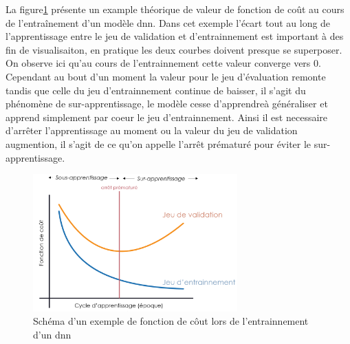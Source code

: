 La figure\ref{fig:loss_func} présente un example théorique de valeur de fonction de coût au cours de l'entraînement d'un modèle \gls{dnn}. Dans cet exemple l'écart tout au long de l'apprentissage entre le jeu de validation et d'entrainnement est important à des fin de visualisaiton, en pratique les deux courbes doivent presque se superposer. On observe ici qu'au cours de l'entrainnement cette valeur converge vers 0. Cependant au bout d'un moment la valeur pour le jeu d'évaluation remonte tandis que celle du jeu d'entrainnement continue de baisser, il s'agit du phénomène de sur-apprentissage, le modèle cesse d'apprendreà généraliser et apprend simplement par coeur le jeu d'entrainnement. Ainsi il est necessaire d'arrêter l'apprentissage au moment ou la valeur du jeu de validation augmention, il s'agit de ce qu'on appelle l'arrêt prématuré pour éviter le sur-apprentissage.
\begin{figure}[!htbp]
 \centering
 \includegraphics[width=0.7\textwidth]{figures/loss_function.png}
 \caption[Schéma d'un exemple de fonction de côut lors d'un entrainnement]{Schéma d'un exemple de fonction de côut lors de l'entrainnement d'un \gls{dnn}}
 \label{fig:loss_func}
\end{figure}
